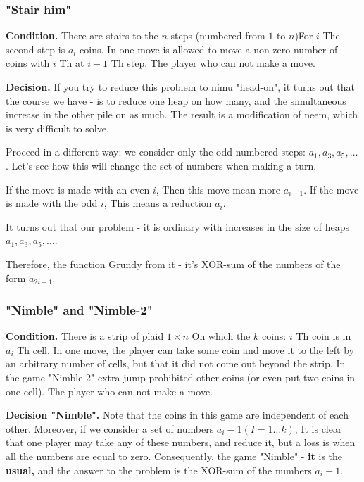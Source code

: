 \subsubsection{ "Stair him" }

\textbf{Condition.} There are stairs to the $n$ steps (numbered from $1$ to $n$)For $i$ The second step is $a_i$ coins. In one move is allowed to move a non-zero number of coins with $i$ Th at $i-1$ Th step. The player who can not make a move.

\textbf{Decision.} If you try to reduce this problem to nimu "head-on", it turns out that the course we have - is to reduce one heap on how many, and the simultaneous increase in the other pile on as much. The result is a modification of neem, which is very difficult to solve.

Proceed in a different way: we consider only the odd-numbered steps: $a_1, a_3, a_5, \ldots$. Let's see how this will change the set of numbers when making a turn.

If the move is made with an even $i$, Then this move mean more $a_ {i-1}$. If the move is made with the odd $i$, This means a reduction $a_i$.

It turns out that our problem - it is ordinary with increases in the size of heaps $a_1, a_3, a_5, \ldots$.

Therefore, the function Grundy from it - it's XOR-sum of the numbers of the form $a_ {2i +1}$.

\subsubsection{ "Nimble" and "Nimble-2" }

\textbf{Condition.} There is a strip of plaid $1 \times n$ On which the $k$ coins: $i$ Th coin is in $a_i$ Th cell. In one move, the player can take some coin and move it to the left by an arbitrary number of cells, but that it did not come out beyond the strip. In the game "Nimble-2" extra jump prohibited other coins (or even put two coins in one cell). The player who can not make a move.

\textbf{Decision "Nimble".} Note that the coins in this game are independent of each other. Moreover, if we consider a set of numbers $a_i-1$$(I = 1 \ldots k)$, It is clear that one player may take any of these numbers, and reduce it, but a loss is when all the numbers are equal to zero. Consequently, the game "Nimble" - \textbf{it} is the \textbf{usual,} and the answer to the problem is the XOR-sum of the numbers $a_i-1$.

